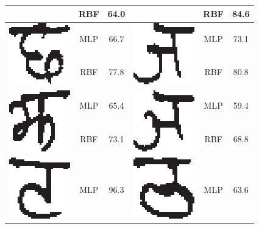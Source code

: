 \begin{table}[h]
\begin{tabular}{|c|c|c|c|c|c|}
\cline{2-3} \cline{5-6}
 & RBF & 64.0 &  & RBF & 84.6\tabularnewline
\hline
\multirow{2}{*}{\includegraphics[scale=0.25]{figures/datasets/nhcr/consonants/7chha}} & MLP & 66.7 & \multirow{2}{*}{\includegraphics[scale=0.25]{figures/datasets/nhcr/consonants/8ja}} & MLP & 73.1\tabularnewline
\cline{2-3} \cline{5-6}
 & RBF & 77.8 &  & RBF & 80.8\tabularnewline
\hline
\multirow{2}{*}{\includegraphics[scale=0.25]{figures/datasets/nhcr/consonants/9jha}} & MLP & 65.4 & \multirow{2}{*}{\includegraphics[scale=0.25]{figures/datasets/nhcr/consonants/10yna}} & MLP & 59.4\tabularnewline
\cline{2-3} \cline{5-6}
 & RBF & 73.1 &  & RBF & 68.8\tabularnewline
\hline
\multirow{2}{*}{\includegraphics[scale=0.25]{figures/datasets/nhcr/consonants/11ta}} & MLP & 96.3 & \multirow{2}{*}{\includegraphics[scale=0.25]{figures/datasets/nhcr/consonants/12tha}} & MLP & 63.6\tabularnewline

\end{tabular}
\end{table}
